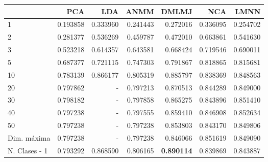\begin{tabular}{lrrrrrr}
\toprule
{} &       PCA &       LDA &      ANMM &     DMLMJ &       NCA &      LMNN \\
\midrule
1             &  0.193858 &  0.333960 &  0.241443 &  0.272016 &  0.336095 &  0.254702 \\
2             &  0.281377 &  0.536269 &  0.459787 &  0.472010 &  0.663861 &  0.541630 \\
3             &  0.523218 &  0.614357 &  0.643581 &  0.668424 &  0.719546 &  0.690011 \\
5             &  0.687377 &  0.721115 &  0.747303 &  0.791867 &  0.818865 &  0.815681 \\
10            &  0.783139 &  0.866177 &  0.805319 &  0.885797 &  0.838369 &  0.848563 \\
20            &  0.797862 &  -        &  0.797213 &  0.870513 &  0.844289 &  0.849000 \\
30            &  0.798182 &  -        &  0.797858 &  0.865275 &  0.843896 &  0.851410 \\
40            &  0.797238 &  -        &  0.797555 &  0.859410 &  0.846908 &  0.852634 \\
50            &  0.797238 &  -        &  0.797238 &  0.853803 &  0.843170 &  0.849806 \\
Dim. máxima   &  0.797238 &  -        &  0.797238 &  0.846066 &  0.851619 &  0.849090 \\
N. Clases - 1 &  0.793292 &  0.868590 &  0.806165 &  \textbf{0.890114} &  0.839869 &  0.843887 \\
\bottomrule
\end{tabular}
